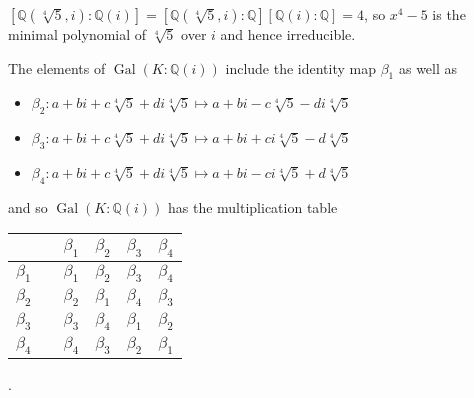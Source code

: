 \documentclass[12pt]{article}
\newcommand{\QQ}{\mathbb{Q}}
\DeclareMathOperator{\Gal}{Gal}
\begin{document}
\begin{enumerate}
\begin{enumerate}
                $[\mathbb{Q}(\sqrt[4]{5}, i) : \mathbb{Q}(i)] = [\mathbb{Q}(\sqrt[4]{5}, i) : \mathbb{Q}][\mathbb{Q}(i) : \mathbb{Q}] = 4$, so $x^4 - 5$ is the minimal polynomial of $\sqrt[4]{5}$ over $i$ and hence irreducible. \par
                The elements of $\Gal(K : \QQ(i))$ include the identity map $\beta_1$ as well as
                \begin{itemize}
                    \item
                        $\beta_2 : a + bi + c\sqrt[4]{5} + di\sqrt[4]{5} \mapsto a + bi - c\sqrt[4]{5} - di\sqrt[4]{5}$
                    \item
                        $\beta_3 : a + bi + c\sqrt[4]{5} + di\sqrt[4]{5} \mapsto a + bi + ci\sqrt[4]{5} - d\sqrt[4]{5}$
                    \item
                        $\beta_4 : a + bi + c\sqrt[4]{5} + di\sqrt[4]{5} \mapsto a + bi - ci\sqrt[4]{5} + d\sqrt[4]{5}$
                \end{itemize}
                and so $\Gal(K : \QQ(i))$ has the multiplication table
                \begin{center}
                    \begin{tabular}{cccccc}
                                  & \vline & $\beta_1$ & $\beta_2$ & $\beta_3$ & $\beta_4$ \\
                        \hline
                        $\beta_1$ & \vline & $\beta_1$ & $\beta_2$ & $\beta_3$ & $\beta_4$ \\
                        $\beta_2$ & \vline & $\beta_2$ & $\beta_1$ & $\beta_4$ & $\beta_3$ \\
                        $\beta_3$ & \vline & $\beta_3$ & $\beta_4$ & $\beta_1$ & $\beta_2$ \\
                        $\beta_4$ & \vline & $\beta_4$ & $\beta_3$ & $\beta_2$ & $\beta_1$
                    \end{tabular}.
                \end{center}
        \end{enumerate}


\end{enumerate}
\end{document}
